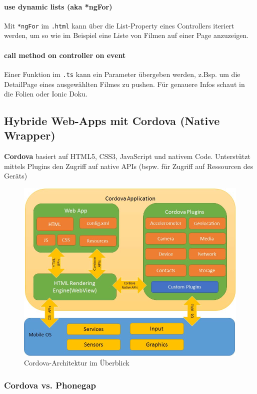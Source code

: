 \documentclass[a4paper]{article}
\begin{document}
{		\paragraph{use dynamic lists (aka *ngFor)}
		
		Mit \texttt{*ngFor} im \texttt{.html} kann über die List-Property eines Controllers iteriert werden, um so wie im Beispiel eine Liste von Filmen auf einer Page anzuzeigen.
		
		\paragraph{call method on controller on event}
		
		Einer Funktion im \texttt{.ts} kann ein Parameter übergeben werden, z.Bsp. um die DetailPage eines ausgewählten Filmes zu pushen. Für genauere Infos schaut in die Folien oder Ionic Doku.
		
	\newpage	
		
	\subsection{Hybride Web-Apps mit Cordova (Native Wrapper)}
	
	\textbf{Cordova} basiert auf HTML5, CSS3, JavaScript und nativem Code.
	Unterstützt mittels Plugins den Zugriff auf native APIs	(bspw. für Zugriff auf Ressourcen des Geräts)
	
	\begin{figure}[!htb]
		\centering
		\includegraphics[width=.55\textwidth]{img/android7/cordova_architecture.jpg}
		\caption{Cordova-Architektur im Überblick}
		\label{fig:cordova_architecture}
	\end{figure}
	
	\subsubsection{Cordova vs. Phonegap} 
	
}
\end{document}
